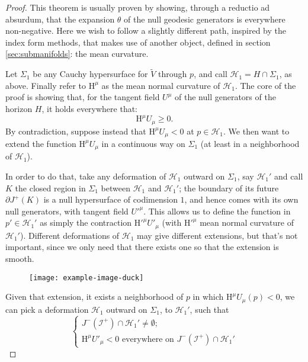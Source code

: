 \begin{proof}
	This theorem is usually proven by showing, through a reductio ad absurdum, that the expansion \(\theta\) of the null geodesic generators is everywhere non-negative. Here we wish to follow a slightly different path, inspired by the index form methods, that makes use of another object, defined in section \ref{sec:submanifolds}: the mean curvature.
	
	Let \(\Sigma_1\) be any Cauchy hypersurface for \(\tilde{V}\) through \(p\), and call \(\mathscr{H}_1 = H \cap \Sigma_1\), as above. Finally refer to \(\mathrm{H}^{\mu}\) as the mean normal curvature of \(\mathscr{H}_1\).
	The core of the proof is showing that, for the tangent field \(U^{\mu}\) of the null generators of the horizon \(H\), it holds everywhere that:
	\begin{equation}
	\label{eq:exp-null-generators}
		\mathrm{H}^{\mu}U_{\mu} \ge 0.
	\end{equation}
	By contradiction, suppose instead that \(\mathrm{H}^{\mu}U_{\mu} < 0\) at \(p\in \mathscr{H}_1\). We then want to extend the function \(\mathrm{H}^{\mu}U_{\mu}\) in a continuous way on \(\Sigma_1\) (at least in a neighborhood of \(\mathscr{H}_1\)). 
	
	In order to do that, take any deformation of \(\mathscr{H}_1\) outward on \(\Sigma_1\), say \(\mathscr{H}_1'\) and call \(K\) the closed region in \(\Sigma_1\) between \(\mathscr{H}_1\) and \(\mathscr{H}_1'\); the boundary of its future \(\partial J^+(K)\) is a null hypersurface of codimension \(1\), and hence comes with its own null generators, with tangent field \(U'^{\mu}\). This allows us to define the function in \(p' \in\mathscr{H}_1'\) as simply the contraction 
	\(\mathrm{H}'^{\mu}U'_{\mu}\) (with \(\mathrm{H}'^{\mu}\) mean normal curvature of \(\mathscr{H}_1'\)). Different deformations of \(\mathscr{H}_1\) may give different extensions, but that's not important, since we only need that there exists one so that the extension is smooth.
	
	\begin{figure}
		\centering
		\texttt{[image: example-image-duck]}
	\end{figure}
	Given that extension, it exists a neighborhood of \(p\) in which \(\mathrm{H}^{\mu}U_{\mu}(p) < 0\), we can pick a deformation \(\mathscr{H}_1\) outward on \(\Sigma_1\), to \(\mathscr{H}_1'\), such that
	\[
	\begin{cases}
	J^-(\mathscr{I}^+) \cap \mathscr{H}_1' \neq \emptyset; \\
	\mathrm{H}^{\mu}U'_{\mu} < 0 \text{ everywhere on } 	J^-(\mathscr{I}^+) \cap \mathscr{H}_1'
	\end{cases}
	\]
	

\end{proof}
